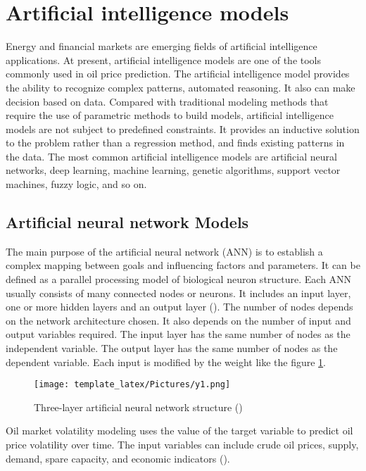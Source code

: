 \section{Artificial intelligence models}
Energy and financial markets are emerging fields of artificial intelligence applications. At present, artificial intelligence models are one of the tools commonly used in oil price prediction. The artificial intelligence model provides the ability to recognize complex patterns, automated reasoning. It also can make decision based on data. Compared with traditional modeling methods that require the use of parametric methods to build models, artificial intelligence models are not subject to predefined constraints. It provides an inductive solution to the problem rather than a regression method, and finds existing patterns in the data. The most common artificial intelligence models are artificial neural networks, deep learning, machine learning, genetic algorithms, support vector machines, fuzzy logic, and so on.

\subsection{Artificial neural network Models}
The main purpose of the artificial neural network (ANN) is to establish a complex mapping between goals and influencing factors and parameters. It can be defined as a parallel processing model of biological neuron structure. Each ANN usually consists of many connected nodes or neurons. It includes an input layer, one or more hidden layers and an output layer (\cite{Y3}). The number of nodes depends on the network architecture chosen. It also depends on the number of input and output variables required. The input layer has the same number of nodes as the independent variable. The output layer has the same number of nodes as the dependent variable. Each input is modified by the weight like the figure \ref{y1}.

\begin{figure}[h]
    \centering
    \texttt{[image: template\_latex/Pictures/y1.png]}
    \caption{Three-layer artificial neural network structure (\cite{Y3})}
    \label{y1}
\end{figure}
Oil market volatility modeling uses the value of the target variable to predict oil price volatility over time. The input variables can include crude oil prices, supply, demand, spare capacity, and economic indicators (\cite{Y2}).


